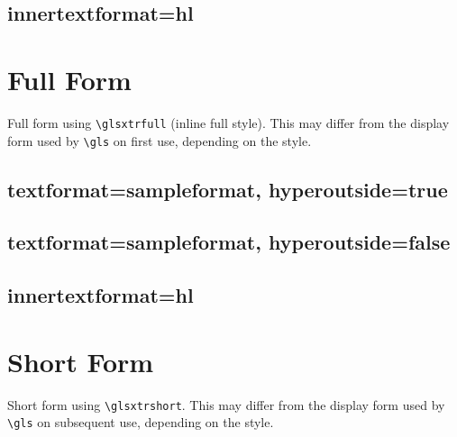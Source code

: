 \documentclass{report}
\begin{document}
\section{innertextformat=hl}


\chapter{Full Form}
Full form using \verb|\glsxtrfull| (inline full style).
This may differ from the display form used by \verb|\gls|
on first use, depending on the style.


\section{textformat=sampleformat, hyperoutside=true}


\section{textformat=sampleformat, hyperoutside=false}


\section{innertextformat=hl}


\chapter{Short Form}
Short form using \verb|\glsxtrshort|.
This may differ from the display form used by \verb|\gls|
on subsequent use, depending on the style.

\end{document}
